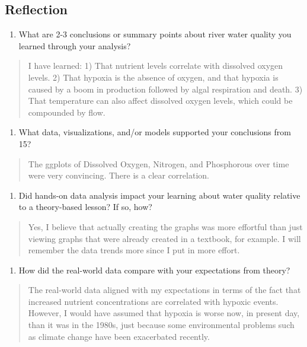 \documentclass[]{article}
\providecommand{\tightlist}{%
  \setlength{\itemsep}{0pt}\setlength{\parskip}{0pt}}
\begin{document}
\hypertarget{reflection}{%
\subsection{Reflection}\label{reflection}}

\begin{enumerate}
\def\labelenumi{\arabic{enumi}.}
\setcounter{enumi}{14}
\tightlist
\item
  What are 2-3 conclusions or summary points about river water quality
  you learned through your analysis?
\end{enumerate}

\begin{quote}
I have learned: 1) That nutrient levels correlate with dissolved oxygen
levels. 2) That hypoxia is the absence of oxygen, and that hypoxia is
caused by a boom in production followed by algal respiration and death.
3) That temperature can also affect dissolved oxygen levels, which could
be compounded by flow.
\end{quote}

\begin{enumerate}
\def\labelenumi{\arabic{enumi}.}
\setcounter{enumi}{15}
\tightlist
\item
  What data, visualizations, and/or models supported your conclusions
  from 15?
\end{enumerate}

\begin{quote}
The ggplots of Dissolved Oxygen, Nitrogen, and Phosphorous over time
were very convincing. There is a clear correlation.
\end{quote}

\begin{enumerate}
\def\labelenumi{\arabic{enumi}.}
\setcounter{enumi}{16}
\tightlist
\item
  Did hands-on data analysis impact your learning about water quality
  relative to a theory-based lesson? If so, how?
\end{enumerate}

\begin{quote}
Yes, I believe that actually creating the graphs was more effortful than
just viewing graphs that were already created in a textbook, for
example. I will remember the data trends more since I put in more
effort.
\end{quote}

\begin{enumerate}
\def\labelenumi{\arabic{enumi}.}
\setcounter{enumi}{17}
\tightlist
\item
  How did the real-world data compare with your expectations from
  theory?
\end{enumerate}

\begin{quote}
The real-world data aligned with my expectations in terms of the fact
that increased nutrient concentrations are correlated with hypoxic
events. However, I would have assumed that hypoxia is worse now, in
present day, than it was in the 1980s, just because some environmental
problems such as climate change have been exacerbated recently.
\end{quote}
\end{document}
